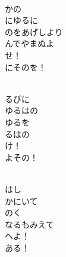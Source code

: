 \documentclass[10pt,b5j]{tarticle} %
\begin{document}
\vspace{1.5em} %
\newcommand{\linespace}{0.5em} %
\newcommand{\blocksize}{0.5\hsize} %
\newcommand{\itemmargin}{6em} %
\begin{enumerate} %
    \setlength{\itemindent}{\itemmargin} %
    \begin{minipage}[c]{\blocksize}
    
        \vspace{\linespace}
        \item~\\
        かの\\
        にゆるに\\
        のをあげしより\\
        んでやまぬよ\\
        せ！\\
        にそのを！
        
        \vspace{\linespace}
        \item~\\
        るびに\\
        ゆるはの\\
        ゆるを\\
        るはの\\
        け！\\
        よその！
        
        \vspace{\linespace}
        \item~\\
        はし\\
        かにいて\\
        のく\\
        なるもみえて\\
        へよ！\\
        ある！
    
    \end{minipage}
\end{enumerate} %
\end{document}
